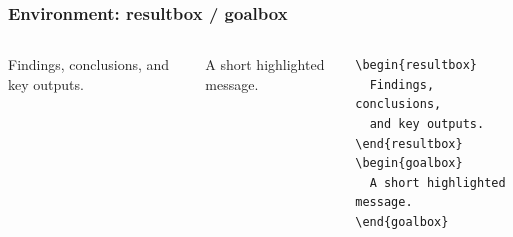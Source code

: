 \documentclass[aspectratio=169,10pt]{beamer}
\begin{document}
\begin{frame}[fragile]
    \frametitle{Environment: resultbox / goalbox}
    \scriptsize
    \begin{columns}[T]
        \begin{resultbox}
            Findings, conclusions, and key outputs.
        \end{resultbox}
        \begin{goalbox}
            \centering A short highlighted message.
        \end{goalbox}
        \begin{lstlisting}[language={[LaTeX]TeX}]
\begin{resultbox}
  Findings, conclusions,
  and key outputs.
\end{resultbox}
\begin{goalbox}
  A short highlighted message.
\end{goalbox}
        \end{lstlisting}
    \end{columns}
\end{frame}
\end{document}
